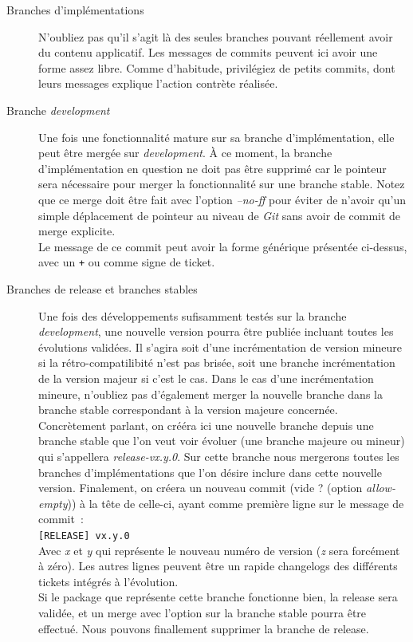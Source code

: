\begin{description}
	\item[Branches d'implémentations]
		N'oubliez pas qu'il s'agit là des seules branches pouvant réellement avoir du contenu applicatif.
		Les messages de commits peuvent ici avoir une forme assez libre.
		Comme d'habitude, privilégiez de petits commits, dont leurs messages explique l'action contrète réalisée.
	\item[Branche \emph{development}]
		Une fois une fonctionnalité mature sur sa branche d'implémentation, elle peut être mergée sur \emph{development}.
		À ce moment, la branche d'implémentation en question ne doit pas être supprimé car le pointeur sera nécessaire pour merger la fonctionnalité sur une branche stable.
		Notez que ce merge doit être fait avec l'option \emph{--no-ff} pour éviter de n'avoir qu'un simple déplacement de pointeur au niveau de \emph{Git} sans avoir de commit de merge explicite.\\

		Le message de ce commit peut avoir la forme générique présentée ci-dessus, avec un {\tt+} ou {\tt*} comme signe de ticket.
	\item[Branches de release et branches stables]
		Une fois des développements sufisamment testés sur la branche \emph{development}, une nouvelle version pourra être publiée incluant toutes les évolutions validées.
		Il s'agira soit d'une incrémentation de version mineure si la rétro-compatilibité n'est pas brisée, soit une branche incrémentation de la version majeur si c'est le cas.
		Dans le cas d'une incrémentation mineure, n'oubliez pas d'également merger la nouvelle branche dans la branche stable correspondant à la version majeure concernée.\\

		Concrètement parlant, on crééra ici une nouvelle branche depuis une branche stable que l'on veut voir évoluer (une branche majeure ou mineur) qui s'appellera \emph{release-vx.y.0}. Sur cette branche nous mergerons toutes les branches d'implémentations que l'on désire inclure dans cette nouvelle version.
		Finalement, on créera un nouveau commit (vide ? (option \emph{allow-empty})) à la tête de celle-ci, ayant comme première ligne sur le message de commit~:\\
		{\tt[RELEASE] vx.y.0}\\
		Avec \emph{x} et \emph{y} qui représente le nouveau numéro de version (\emph{z} sera forcément à zéro).
		Les autres lignes peuvent être un rapide changelogs des différents tickets intégrés à l'évolution.\\
		Si le package que représente cette branche fonctionne bien, la release sera validée, et un merge avec l'option  sur la branche stable pourra être effectué.
		Nous pouvons finallement supprimer la branche de release.


\end{description}
